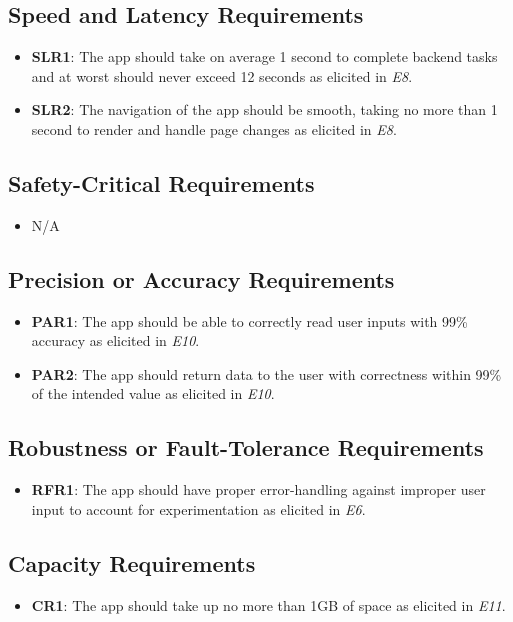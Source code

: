 \documentclass[12pt]{article}
\begin{document}
\subsection{Speed and Latency Requirements}
\begin{itemize}
  \item \textbf{SLR1}: The app should take on average 1 second to complete backend tasks and at worst should never
  exceed 12 seconds as elicited in \textit{E8}.
  \item \textbf{SLR2}: The navigation of the app should be smooth, taking no more than 1 second to render and handle page changes
  as elicited in \textit{E8}.
\end{itemize}
\subsection{Safety-Critical Requirements}
\begin{itemize}
  \item N/A
\end{itemize}
\subsection{Precision or Accuracy Requirements}
\begin{itemize}
  \item \textbf{PAR1}: The app should be able to correctly read user inputs with 99\% accuracy as elicited
  in \textit{E10}.
  \item \textbf{PAR2}: The app should return data to the user with correctness within 99\% of the intended value
  as elicited in \textit{E10}.
\end{itemize}
\subsection{Robustness or Fault-Tolerance Requirements}
\begin{itemize}
  \item \textbf{RFR1}: The app should have proper error-handling against improper user input to account for
  experimentation as elicited in \textit{E6}.
\end{itemize}
\subsection{Capacity Requirements}
\begin{itemize}
  \item \textbf{CR1}: The app should take up no more than 1GB of space as elicited in \textit{E11}.
\end{itemize}
\end{document}
